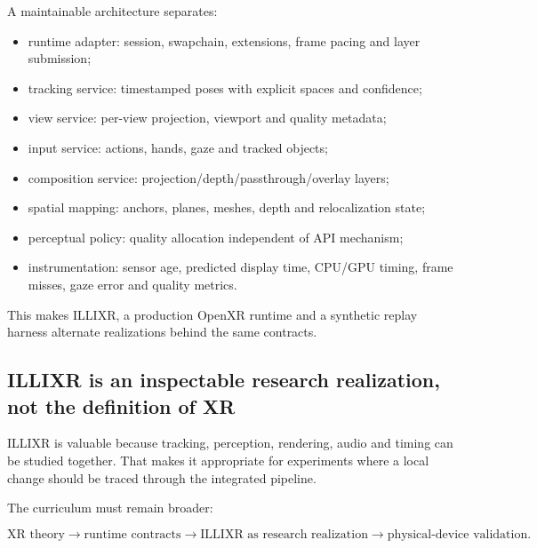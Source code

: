 \hypertarget{04-visual-computing-ii-ch035-xr-engine-architecture-should-expose-services-not-one-monolithic-headset-object}{}

A maintainable architecture separates:

\begin{itemize}
\tightlist
\item
  runtime adapter: session, swapchain, extensions, frame pacing and layer submission;
\item
  tracking service: timestamped poses with explicit spaces and confidence;
\item
  view service: per-view projection, viewport and quality metadata;
\item
  input service: actions, hands, gaze and tracked objects;
\item
  composition service: projection/depth/passthrough/overlay layers;
\item
  spatial mapping: anchors, planes, meshes, depth and relocalization state;
\item
  perceptual policy: quality allocation independent of API mechanism;
\item
  instrumentation: sensor age, predicted display time, CPU/GPU timing, frame misses, gaze error and quality metrics.
\end{itemize}

This makes ILLIXR, a production OpenXR runtime and a synthetic replay harness alternate realizations behind the same contracts.

\subsection{ILLIXR is an inspectable research realization, not the definition of XR}\label{04-visual-computing-ii-ch035-illixr-is-an-inspectable-research-realization-not-the-definition-of-xr}

\hypertarget{04-visual-computing-ii-ch035-illixr-is-an-inspectable-research-realization-not-the-definition-of-xr}{}

ILLIXR is valuable because tracking, perception, rendering, audio and timing can be studied together. That makes it appropriate for experiments where a local change should be traced through the integrated pipeline.

The curriculum must remain broader:

\[
\text{XR theory}\rightarrow
\text{runtime contracts}\rightarrow
\text{ILLIXR as research realization}\rightarrow
\text{physical-device validation}.
\]

